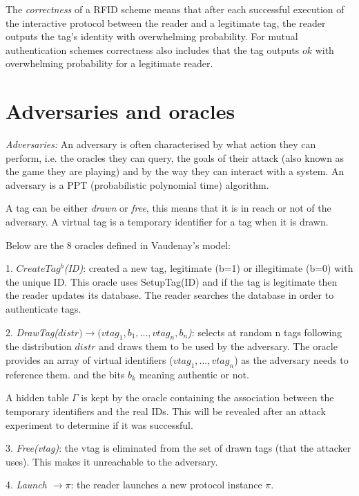     The \textit{correctness} of a RFID scheme means that after each successful execution of the interactive protocol between the reader and a 
    legitimate tag, the reader outputs the tag's identity with overwhelming probability. For mutual authentication schemes correctness also includes
    that the tag outputs $ok$ with overwhelming probability for a legitimate reader.

\section{Adversaries and oracles}

    \textit{Adversaries:} An adversary is often characterised by what action they can perform, i.e. the oracles they can query, 
    the goals of their attack (also known as the game they are playing) and by the way they can interact with a system. An adversary
    is a PPT (probabilistic polynomial time) algorithm.
    
    A tag can be either \textit{drawn} or \textit{free}, this means that it is in reach or not of the 
    adversary. A virtual tag is a temporary identifier for a tag when it is drawn.

    Below are the 8 oracles defined in Vaudenay's model:

    1. \textit{$CreateTag^b$(ID)}: created a new tag, legitimate (b=1) or illegitimate (b=0) with the unique ID.
        This oracle uses SetupTag(ID) and if the tag is legitimate then the reader 
        updates its database. The reader searches the database in order to authenticate tags.
    
    2. \textit{DrawTag($distr) \rightarrow (vtag_1, b_1, ... , vtag_n, b_n$)}: selects at random n tags following the 
    distribution $distr$ and draws them to be used by the adversary. The oracle provides
    an array of virtual identifiers ($vtag_1, ... ,vtag_n$) as the adversary needs to reference them.
    and the bits $b_k$ meaning authentic or not. 
    
    A hidden table $\Gamma$ is kept by the oracle containing the association between the temporary identifiers and the real IDs.
    This will be revealed after an attack experiment to determine if it was successful.

    3. \textit{Free(vtag)}: the vtag is eliminated from the set of drawn tags (that the attacker uses). This makes it unreachable to the adversary.
    
    4. \textit{Launch $\rightarrow \pi$}: the reader launches a new protocol instance $\pi$.


